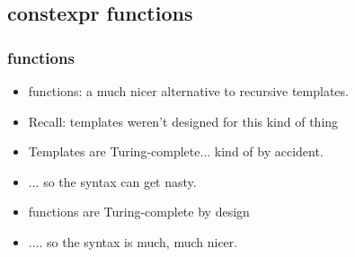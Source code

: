 \subsection{constexpr functions}
\begin{frame}[fragile,t]
\frametitle{\cexpr functions}
\begin{itemize}[<+->]
\item \cexpr functions: a much nicer alternative to
  recursive templates.

\item Recall: templates weren't designed for this kind of thing
\item Templates are Turing-complete... kind of by accident.
\item ... so the syntax can get nasty.
\item \cexpr functions are Turing-complete by design
\item .... so the syntax is much, much nicer.






\end{itemize}
\end{frame}



